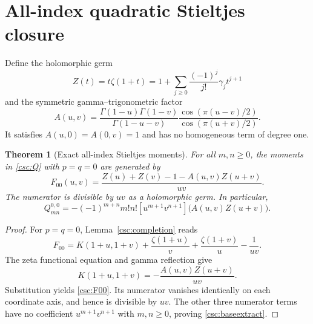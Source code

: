 \documentclass[11pt,a4paper]{article}
\numberwithin{equation}{section}
\newtheorem{theorem}{Theorem}[section]
\theoremstyle{definition}
\begin{document}
\section{All-index quadratic Stieltjes closure}\label{csc:base-section}
Define the holomorphic germ
\begin{equation}\label{csc:Z}
Z(t)=t\zeta(1+t)=1+\sum_{j\ge0}\frac{(-1)^j}{j!}\gamma_j t^{j+1}
\end{equation}
and the symmetric gamma--trigonometric factor
\begin{equation}\label{csc:A}
A(u,v)=\frac{\Gamma(1-u)\Gamma(1-v)}{\Gamma(1-u-v)}
\frac{\cos(\pi(u-v)/2)}{\cos(\pi(u+v)/2)}.
\end{equation}
It satisfies $A(u,0)=A(0,v)=1$ and has no homogeneous term of degree one.

\begin{theorem}[Exact all-index Stieltjes moments]\label{csc:base}
For all $m,n\ge0$, the moments in \eqref{csc:Q} with $p=q=0$ are generated by
\begin{equation}\label{csc:F00}
F_{00}(u,v)=\frac{Z(u)+Z(v)-1-A(u,v)Z(u+v)}{uv}.
\end{equation}
The numerator is divisible by $uv$ as a holomorphic germ. In particular,
\begin{equation}\label{csc:baseextract}
Q_{mn}^{0,0}=-(-1)^{m+n}m!n!
[u^{m+1}v^{n+1}]\big(A(u,v)Z(u+v)\big).
\end{equation}
\end{theorem}
\begin{proof}
For $p=q=0$, Lemma~\ref{csc:completion} reads
\[
F_{00}=K(1+u,1+v)+\frac{\zeta(1+u)}v+\frac{\zeta(1+v)}u-\frac1{uv}.
\]
The zeta functional equation and gamma reflection give
\begin{equation}\label{csc:KAZ}
K(1+u,1+v)=-\frac{A(u,v)Z(u+v)}{uv}.
\end{equation}
Substitution yields \eqref{csc:F00}. Its numerator vanishes identically on each coordinate axis, and hence is divisible by $uv$. The other three numerator terms have no coefficient $u^{m+1}v^{n+1}$ with $m,n\ge0$, proving \eqref{csc:baseextract}.
\end{proof}
\end{document}
